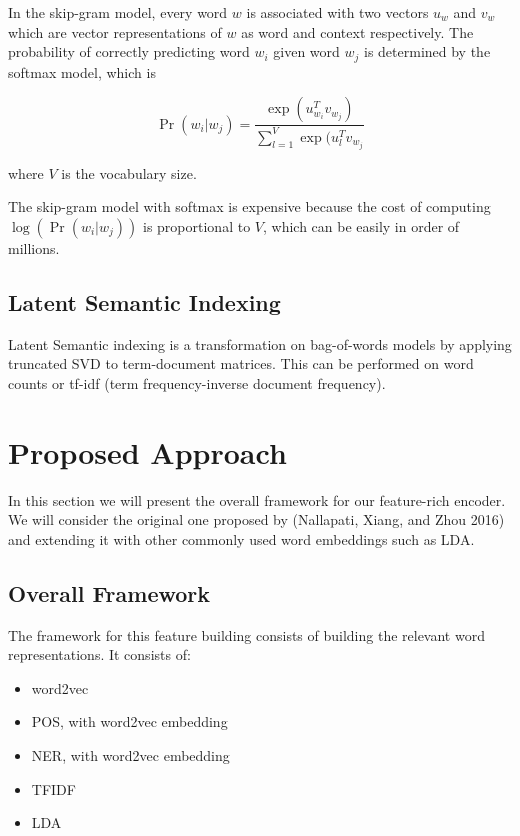 In the skip-gram model, every word \(w\) is associated with two vectors
\(u_w\) and \(v_w\) which are vector representations of \(w\) as word
and context respectively. The probability of correctly predicting word
\(w_i\) given word \(w_j\) is determined by the softmax model, which is

\[ \Pr (w_i | w_j) = \frac{\exp(u_{w_i}^T v_{w_j})}{\sum_{l=1}^V \exp(u_l^T v_{w_j}} \]

where \(V\) is the vocabulary size.

The skip-gram model with softmax is expensive because the cost of
computing \(\log (\Pr(w_i | w_j))\) is proportional to \(V\), which can
be easily in order of millions.

\subsection{Latent Semantic Indexing}\label{latent-semantic-indexing}

Latent Semantic indexing is a transformation on bag-of-words models by
applying truncated SVD to term-document matrices. This can be performed
on word counts or tf-idf (term frequency-inverse document frequency).

\section{Proposed Approach}\label{proposed-approach}

In this section we will present the overall framework for our
feature-rich encoder. We will consider the original one proposed by
(Nallapati, Xiang, and Zhou 2016) and extending it with other commonly
used word embeddings such as LDA.

\subsection{Overall Framework}\label{overall-framework}

The framework for this feature building consists of building the
relevant word representations. It consists of:

\begin{itemize}
\tightlist
\item
  word2vec
\item
  POS, with word2vec embedding
\item
  NER, with word2vec embedding
\item
  TFIDF
\item
  LDA
\end{itemize}

